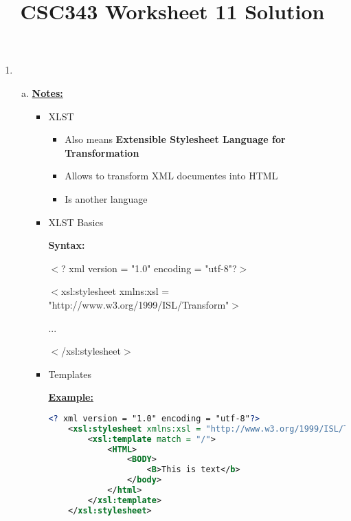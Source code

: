 \documentclass[12pt]{article}
\begin{document}
\title{CSC343 Worksheet 11 Solution}
\maketitle

\begin{enumerate}[1.]
    \item

    \begin{enumerate}[a)]
        \item

        \bigskip

        \underline{\textbf{Notes:}}

        \bigskip

        \begin{itemize}
            \item XLST
            \begin{itemize}
                \item Also means \textbf{Extensible Stylesheet Language for Transformation}
                \item Allows to transform XML documentes into HTML
                \item Is another language
            \end{itemize}
            \item XLST Basics

            \bigskip

            \textbf{Syntax:}

            \bigskip

            $<$? xml version = "1.0" encoding = "utf-8"?$>$

            $<$xsl:stylesheet xmlns:xsl = "http://www.w3.org/1999/ISL/Transform"$>$

            \quad...

            $<$/xsl:stylesheet$>$


            \item Templates

            \bigskip

            \underline{\textbf{Example:}}

    \begin{lstlisting}[language=XML]
    <? xml version = "1.0" encoding = "utf-8"?>
    <xsl:stylesheet xmlns:xsl = "http://www.w3.org/1999/ISL/Transform">
        <xsl:template match = "/">
            <HTML>
                <BODY>
                    <B>This is text</b>
                </body>
            </html>
        </xsl:template>
    </xsl:stylesheet>
    \end{lstlisting}


\end{itemize}
\end{enumerate}
\end{enumerate}
\end{document}
